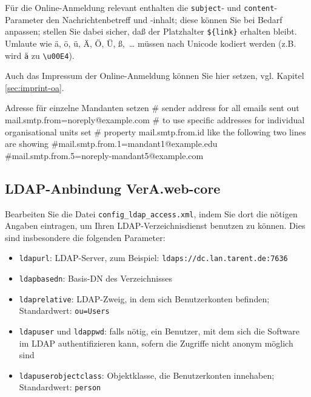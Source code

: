 \documentclass{tarentanleitung}
\begin{document}
Für die Online-Anmeldung relevant enthalten die \texttt{subject}‑
und \texttt{content}-Parameter den Nachrichtenbetreff und -inhalt;
diese können Sie bei Bedarf anpassen; stellen Sie dabei sicher,
daß der Platzhalter \texttt{\$\{link\}} erhalten bleibt.
Umlaute wie ä, ö, ü, Ä, Ö, Ü, ß,~… müssen nach Unicode kodiert
werden (z.B. wird \texttt{ä} zu \texttt{\textbackslash{}u00E4}).

\begin{minipage}{\linewidth}
Auch das Impressum der Online-Anmeldung können Sie hier setzen,
vgl. Kapitel \ref{sec:imprint-oa}.

\begin{lstdump}{Adresse für einzelne Mandanten setzen}
# sender address for all emails sent out
mail.smtp.from=noreply@example.com
# to use specific addresses for individual organisational units set
# property mail.smtp.from.{id} like the following two lines are showing
#mail.smtp.from.1=mandant1@example.edu
#mail.smtp.from.5=noreply-mandant5@example.com
\end{lstdump}
\end{minipage}

\subsection{LDAP-Anbindung VerA.web-core}\label{subsec:setup-core-ldap}

Bearbeiten Sie die Datei \texttt{config\_ldap\_access.xml}, indem Sie
dort die nötigen Angaben eintragen, um Ihren LDAP-Verzeichnisdienst
benutzen zu können. Dies sind insbesondere die folgenden Parameter:\keinumbruch

\begin{itemize}
 \item{\texttt{ldapurl}: LDAP-Server, zum Beispiel:
  \texttt{ldaps://dc.lan.tarent.de:7636}}
 \item{\texttt{ldapbasedn}: Basis-DN des Verzeichnisses}
 \item{\texttt{ldaprelative}: LDAP-Zweig, in dem sich Benutzerkonten
  befinden; Standardwert: \texttt{ou=Users}}
 \item{\texttt{ldapuser} und \texttt{ldappwd}: falls nötig, ein
  Benutzer, mit dem sich die Software im LDAP authentifizieren kann,
  sofern die Zugriffe nicht anonym möglich sind}
 \item{\texttt{ldapuserobjectclass}: Objektklasse, die Benutzerkonten
  innehaben; Standardwert: \texttt{person}}
\end{itemize}
\end{document}
